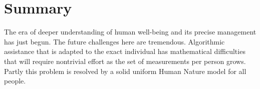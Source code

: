 \documentclass{amsart}
\begin{document}
\section{Summary}
The era of deeper understanding of human well-being and its precise management has just begun.  The future challenges here are tremendous.  Algorithmic assistance that is adapted to the exact individual has mathematical difficulties that will require nontrivial effort as the set of measurements per person grows.  Partly this problem is resolved by a solid uniform Human Nature model for all people.  
\end{document}
